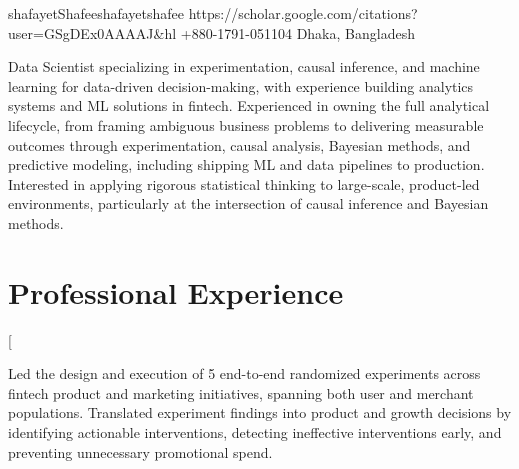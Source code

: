 \documentclass[10pt]{article}
\begin{document}


           {shafayetShafee}{shafayetshafee}
           {https://scholar.google.com/citations?user=GSgDEx0AAAAJ&hl}
           {+880-1791-051104}
           {Dhaka, Bangladesh}



\vspace{5pt}

Data Scientist specializing in experimentation, causal inference, and machine
learning for data-driven decision-making, with experience building analytics
systems and ML solutions in fintech. Experienced in owning the full analytical
lifecycle, from framing ambiguous business problems to delivering measurable
outcomes through experimentation, causal analysis, Bayesian methods, and
predictive modeling, including shipping ML and data pipelines to production.
Interested in applying rigorous statistical thinking to large-scale,
product-led environments, particularly at the intersection of causal inference
and Bayesian methods.

\vspace{-2pt}


\section*{Professional Experience}

\cvblock[

  \item Led the design and execution of 5 end-to-end randomized experiments across
  fintech product and marketing initiatives, spanning both user and merchant
  populations. Translated experiment findings into product and growth decisions
  by identifying actionable interventions, detecting ineffective interventions
  early, and preventing unnecessary promotional spend.
\end{document}
